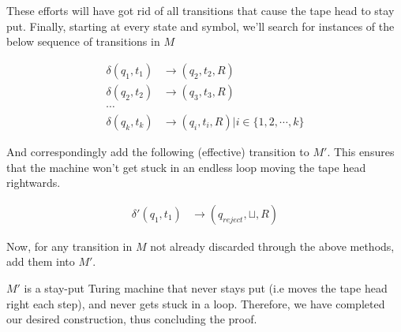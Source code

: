 \documentclass{article}
\begin{document}
These efforts will have got rid of all transitions that cause the tape head to stay put. Finally, starting at every state and symbol, we'll search for instances of the below sequence of transitions in $M$

\begin{align*}
    \delta(q_1, t_1)             & \rightarrow (q_2, t_2, R) \\
    \delta(q_2, t_2)             & \rightarrow (q_3, t_3, R) \\
    \cdots \\
    \delta(q_k, t_k)             & \rightarrow (q_i, t_i, R) | i \in \{1, 2, \cdots , k\}
\end{align*}

And correspondingly add the following (effective) transition to $M'$. This ensures that the machine won't get stuck in an endless loop moving the tape head rightwards.

\begin{align*}
    \delta'(q_1, t_1) & \rightarrow (q_{reject}, \sqcup, R)
\end{align*}

Now, for any transition in $M$ not already discarded through the above methods, add them into $M'$.

$M'$ is a stay-put Turing machine that never stays put (i.e moves the tape head right each step), and never gets stuck in a loop. Therefore, we have completed our desired construction, thus concluding the proof.
\end{document}
